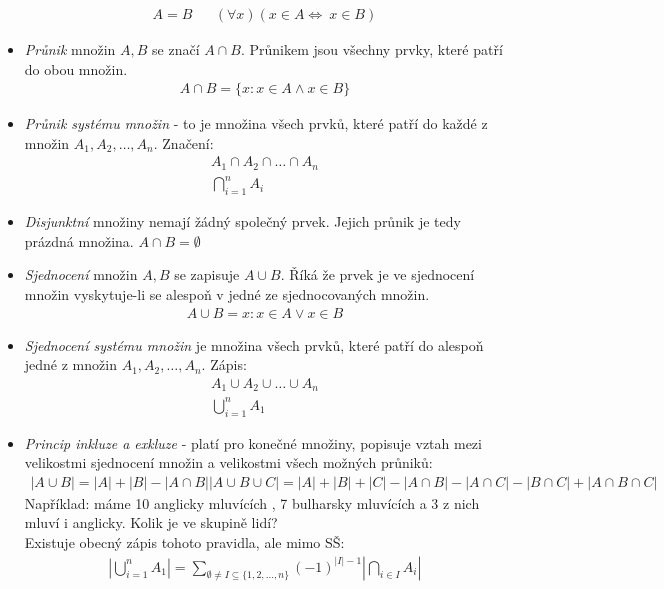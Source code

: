 \documentclass[12pt]{article}
\begin{document}
\begin{itemize}
\begin{align}
A = B && (\forall x)(x \in A \iff \ x \in B)
\end{align}
\item \emph{Průnik} množin $A,B$ se značí $A \cap B$. Průnikem jsou všechny prvky, které patří do obou množin.
\begin{align}
A \cap B = \{ x: x \in A \land x \in B\}
\end{align}
\item \emph{Průnik systému množin} - to je množina všech prvků, které patří do každé z množin $A_1, A_2, \dotsc , A_n$. Značení:
\begin{align}
A_1 \cap A_2 \cap \dotso \cap A_n \\
\bigcap_{i=1}^n A_i
\end{align}
\item \emph{Disjunktní} množiny nemají žádný společný prvek. Jejich průnik je tedy prázdná množina. $ A \cap B = \emptyset$
\item \emph{Sjednocení} množin $A,B$ se zapisuje $A \cup B$. Říká že prvek je ve sjednocení množin vyskytuje-li se alespoň v jedné ze sjednocovaných množin.
\begin{align}
A \cup B = {x: x \in A \lor x \in B}
\end{align}
\item \emph{Sjednocení systému množin} je množina všech prvků, které patří do alespoň jedné z množin $A_1, A_2, \dotsc , A_n$. Zápis:
\begin{align}
A_1 \cup A_2 \cup \dotso \cup  A_n \\
\bigcup_{i=1}^{n} A_1
\end{align}
\item \emph{Princip inkluze a exkluze} - platí pro konečné množiny, popisuje vztah mezi velikostmi sjednocení množin a velikostmi všech možných průniků:
\begin{align}
|A \cup B| = |A| + |B| - |A \cap B|
|A \cup B \cup C| = |A| + |B| + |C| - |A \cap B| - |A \cap C| - |B \cap C| + |A \cap B \cap C|
\end{align}
Například: máme 10 anglicky mluvících , 7 bulharsky mluvících a 3 z nich mluví i anglicky. Kolik je ve skupině lidí?\\
Existuje obecný zápis tohoto pravidla, ale mimo SŠ:
\begin{align}
\left| \bigcup_{i=1}^n A_1  \right| = \sum_{\emptyset \neq I \subseteq \{ 1,2, \dotsc , n\} } \left(-1 \right)^{|I|-1} \left| \bigcap_{i \in I} A_i \right|
\end{align}

\end{itemize}
\end{document}
